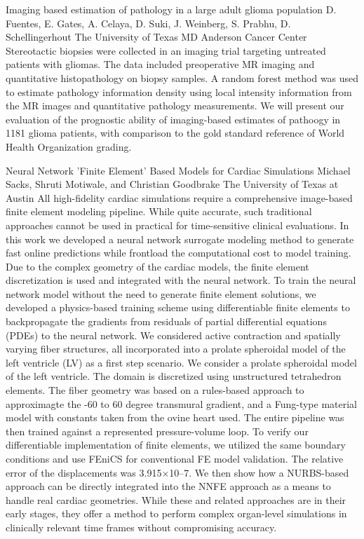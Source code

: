 \vspace{1.5ex}
\abs
{Imaging based estimation of pathology in a large adult glioma population}
{D. Fuentes, E. Gates, A. Celaya, D. Suki, J. Weinberg, S. Prabhu, D. Schellingerhout}
{The University of Texas MD Anderson Cancer Center}
{Stereotactic biopsies were collected in an imaging trial targeting untreated patients with gliomas. The data included preoperative MR imaging and quantitative histopathology on biopsy samples. A random forest method was used to estimate pathology information density using local intensity information from the MR images and quantitative pathology measurements.  We will present our evaluation of the prognostic ability of imaging-based estimates of pathoogy in 1181 glioma patients, with comparison to the gold standard reference of World Health Organization grading.}


\vspace{1.5ex}
\abs
{Neural Network ’Finite Element’ Based Models for Cardiac Simulations}
{Michael Sacks, Shruti Motiwale, and Christian Goodbrake}
{The University of Texas at Austin}
{All high-fidelity cardiac simulations require a comprehensive image-based finite element modeling pipeline. While quite accurate, such traditional approaches cannot be used in practical for time-sensitive clinical evaluations. In this work we developed a neural network surrogate modeling method to generate fast online predictions while frontload the computational cost to model training. Due to the complex geometry of the cardiac models, the finite element discretization is used and integrated with the neural network. To train the neural network model without the need to generate finite element solutions, we developed a physics-based training scheme using differentiable finite elements to backpropagate the gradients from residuals of partial differential equations (PDEs) to the neural network. We considered active contraction and spatially varying fiber structures, all incorporated into a prolate spheroidal model of the left ventricle (LV) as a first step scenario. We consider a prolate spheroidal model of the left ventricle. The domain is discretized using unstructured tetrahedron elements. The fiber geometry was based on a rules-based approach to approximagte the -60 to 60 degree transmural gradient, and a Fung-type material model with constants taken from the ovine heart used.  The entire pipeline was then trained against a represented pressure-volume loop. To verify our differentiable implementation of finite elements, we utilized the same boundary conditions and use FEniCS for conventional FE model validation. The relative error of the displacements was 3.915×10–7. We then show how a NURBS-based approach can be directly integrated into the NNFE approach as a means to handle real cardiac geometries.  While these and related approaches are in their early stages, they offer a method to perform complex organ-level simulations in clinically relevant time frames without compromising accuracy.}